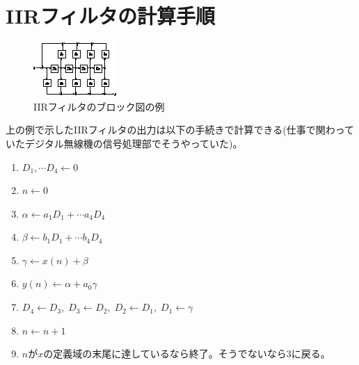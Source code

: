 	\chapter{IIRフィルタの計算手順}
		\begin{figure}[H]
			\centering
			\includegraphics[keepaspectratio, scale=5]
			{parts/Z-transform/imgs/IIR-filter/calculationMethod/blockDiagram.eps}
			\caption{IIRフィルタのブロック図の例}
		\end{figure}
		上の例で示したIIRフィルタの出力は以下の手続きで計算できる(仕事で関わっていたデジタル無線機の信号処理部でそうやっていた)。
		\begin{enumerate}
			\item $D_1,\cdots D_4 \leftarrow 0$
			\item $n \leftarrow 0$
			\item $\alpha \leftarrow a_1D_1 + \cdots a_4D_4$
			\item $\beta \leftarrow b_1D_1 + \cdots b_4D_4$
			\item $\gamma \leftarrow x(n) + \beta$
			\item $y(n) \leftarrow \alpha + a_0\gamma$
			\item $D_4 \leftarrow D_3,\;D_3 \leftarrow D_2,\;D_2 \leftarrow D_1,\;D_1 \leftarrow \gamma$
			\item $n \leftarrow n+1$
			\item $n$が$x$の定義域の末尾に達しているなら終了。そうでないなら3に戻る。
		\end{enumerate}